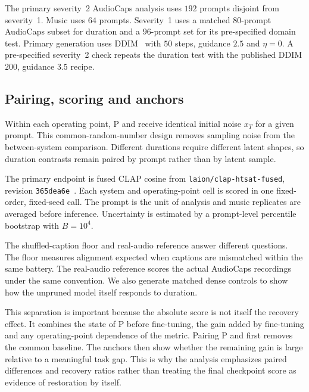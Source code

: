 The primary severity~2 AudioCaps analysis uses $192$ prompts disjoint from severity~1. Music uses $64$ prompts. Severity~1 uses a matched $80$-prompt AudioCaps subset for duration and a $96$-prompt set for its pre-specified domain test. Primary generation uses DDIM~\cite{song2021ddim} with $50$ steps, guidance $2.5$ and $\eta=0$. A pre-specified severity~2 check repeats the duration test with the published DDIM $200$, guidance $3.5$ recipe.

\subsection{Pairing, scoring and anchors}
Within each operating point, P and \PFT{} receive identical initial noise $x_T$ for a given prompt. This common-random-number design removes sampling noise from the between-system comparison. Different durations require different latent shapes, so duration contrasts remain paired by prompt rather than by latent sample.

The primary endpoint is fused CLAP cosine from \texttt{laion/\allowbreak clap-htsat-fused}, revision \texttt{365dea6e}~\cite{wu2023clap}. Each system and operating-point cell is scored in one fixed-order, fixed-seed call. The prompt is the unit of analysis and music replicates are averaged before inference. Uncertainty is estimated by a prompt-level percentile bootstrap with $B=10^{4}$.

The shuffled-caption floor and real-audio reference answer different questions. The floor measures alignment expected when captions are mismatched within the same battery. The real-audio reference scores the actual AudioCaps recordings under the same convention. We also generate matched dense controls to show how the unpruned model itself responds to duration.

This separation is important because the absolute \PFT{} score is not itself the recovery effect. It combines the state of P before fine-tuning, the gain added by fine-tuning and any operating-point dependence of the metric. Pairing P and \PFT{} first removes the common baseline. The anchors then show whether the remaining gain is large relative to a meaningful task gap. This is why the analysis emphasizes paired differences and recovery ratios rather than treating the final checkpoint score as evidence of restoration by itself.

